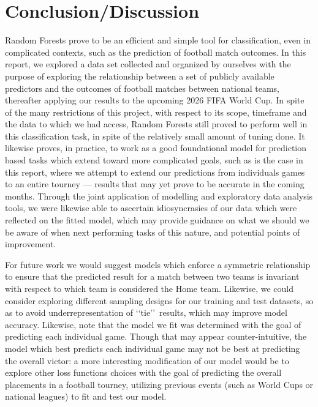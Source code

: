 \documentclass[12pt,paper=letter,leqno]{scrartcl}
\begin{document}
\section{Conclusion/Discussion}

Random Forests prove to be an efficient and simple tool for classification, even in complicated contexts, such as the prediction of football match outcomes. In this report, we explored a data set collected and organized by ourselves with the purpose of exploring the relationship between a set of publicly available predictors and the outcomes of football matches between national teams, thereafter applying our results to the upcoming 2026 FIFA World Cup. In spite of the many restrictions of this project, with respect to its scope, timeframe and the data to which we had access, Random Forests still proved to perform well in this classification task, in spite of the relatively small amount of tuning done. It likewise proves, in practice, to work as a good foundational model for prediction based tasks which extend toward more complicated goals, such as is the case in this report, where we attempt to extend our predictions from individuals games to an entire tourney --- results that may yet prove to be accurate in the coming months. Through the joint application of modelling and exploratory data analysis tools, we were likewise able to ascertain idiosyncrasies of our data which were reflected on the fitted model, which may provide guidance on what we should we be aware of when next performing tasks of this nature, and potential points of improvement.

For future work we would suggest models which enforce a symmetric relationship to ensure that the predicted result for a match between two teams is invariant with respect to which team is considered the Home team. Likewise, we could consider exploring different sampling designs for our training and test datasets, so as to avoid underrepresentation of \lq\lq tie\rq\rq\ results, which may improve model accuracy. Likewise, note that the model we fit was determined with the goal of predicting each individual game. Though that may appear counter-intuitive, the model which best predicts each individual game may not be best at predicting the overall victor: a more interesting modification of our model would be to explore other loss functions choices with the goal of predicting the overall placements in a football tourney, utilizing previous events (such as World Cups or national leagues) to fit and test our model.
\end{document}
